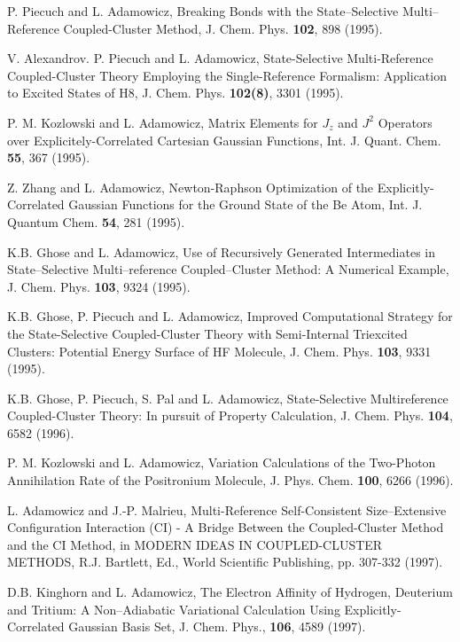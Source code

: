 {{\begin{thebibliography}{999}
P. Piecuch and L. Adamowicz, Breaking 
Bonds with the State--Selective Multi--Reference Coupled-Cluster 
Method, J. Chem. Phys. {\bf 102}, 898 (1995).


V. Alexandrov. P. Piecuch and L. Adamowicz, 
State-Selective Multi-Reference Coupled-Cluster Theory
Employing the Single-Reference Formalism:  Application 
to Excited States of H8, J. Chem. Phys.
{\bf 102(8)}, 3301 (1995).

P. M. Kozlowski and L. Adamowicz, Matrix Elements 
for  $J_z$ and $J^2$  Operators over Explicitely-Correlated
Cartesian Gaussian Functions, 
Int. J. Quant. Chem. {\bf 55}, 367 (1995).

Z. Zhang and L. Adamowicz, Newton-Raphson Optimization 
of the Explicitly-Correlated Gaussian
Functions for the Ground State of the Be Atom, 
Int. J. Quantum Chem.  {\bf 54}, 281 (1995).

K.B. Ghose and L. Adamowicz, Use of Recursively 
Generated Intermediates in State--Selective
Multi--reference Coupled--Cluster Method:  
A Numerical Example, J. Chem. Phys. {\bf 103}, 9324 (1995).



K.B. Ghose, P. Piecuch and L. Adamowicz, 
Improved Computational Strategy for the State-Selective
Coupled-Cluster Theory with Semi-Internal Triexcited Clusters:  
Potential Energy Surface of HF
Molecule, J. Chem. Phys. {\bf 103}, 9331 (1995).

K.B. Ghose, P. Piecuch, S. Pal and L. Adamowicz, 
State-Selective Multireference Coupled-Cluster
Theory:  In pursuit of Property Calculation, 
J. Chem. Phys. {\bf 104}, 6582 (1996).

P. M. Kozlowski and L. Adamowicz, Variation 
Calculations of the Two-Photon Annihilation Rate of the
Positronium Molecule, J. Phys. Chem. {\bf 100}, 6266 (1996).



L. Adamowicz and J.-P. Malrieu, Multi-Reference Self-Consistent 
Size--Extensive Configuration
Interaction (CI) - A Bridge Between the Coupled-Cluster 
Method and the CI Method, in MODERN
IDEAS IN COUPLED-CLUSTER METHODS, R.J. Bartlett, 
Ed., World Scientific Publishing, pp. 307-332 (1997).

D.B. Kinghorn and L. Adamowicz, 
The Electron Affinity of Hydrogen, Deuterium and Tritium:  
A Non--Adiabatic Variational Calculation Using Explicitly-Correlated 
Gaussian Basis Set, J. Chem. Phys.,
{\bf 106}, 4589 (1997).


\end{thebibliography}}}
